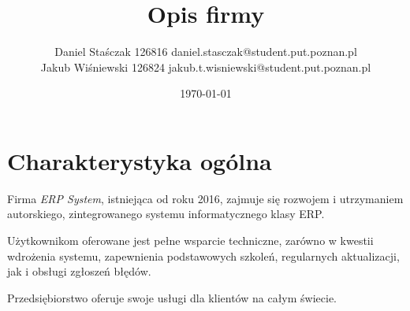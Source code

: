\documentclass{article}
\title{Opis firmy \insertcompanyname}
\author{
    Daniel Staśczak 126816 daniel.stasczak@student.put.poznan.pl
    \\
    Jakub Wiśniewski 126824 jakub.t.wisniewski@student.put.poznan.pl
}
\date{\today}
\newcommand{\insertcompanyname}{\textit{ERP System}}
\begin{document}
    \maketitle

    \newpage
    \tableofcontents
    \listoffigures
    \listoftables

    \newpage
    \section{Charakterystyka ogólna}
        Firma \insertcompanyname, istniejąca od roku 2016, zajmuje się rozwojem i utrzymaniem autorskiego, zintegrowanego systemu informatycznego klasy ERP.

        Użytkownikom oferowane jest pełne wsparcie techniczne, zarówno w kwestii wdrożenia systemu, zapewnienia podstawowych szkoleń, regularnych aktualizacji, jak i obsługi zgłoszeń błędów.

        Przedsiębiorstwo oferuje swoje usługi dla klientów na całym świecie.

    \newpage
\end{document}

